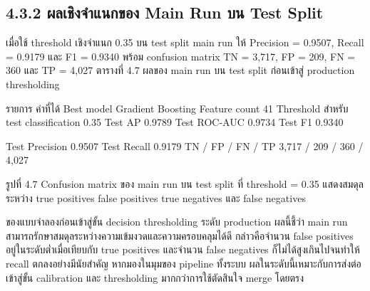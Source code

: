 \documentclass[12pt,a4paper]{report}
\begin{document}
\subsection*{4.3.2 ผลเชิงจำแนกของ Main Run บน Test Split}
เมื่อใช้ threshold เชิงจำแนก 0.35 บน test split main run ให้ Precision = 0.9507, Recall = 0.9179 และ F1 = 0.9340 พร้อม confusion matrix TN = 3,717, FP = 209, FN = 360 และ TP = 4,027 ตารางที่ 4.7 ผลของ main run บน test split ก่อนเข้าสู่ production thresholding\par
รายการ ค่าที่ได้ Best model Gradient Boosting Feature count 41 Threshold สำหรับ test classification 0.35 Test AP 0.9789 Test ROC-AUC 0.9734 Test F1 0.9340\par
\clearpage
Test Precision 0.9507 Test Recall 0.9179 TN / FP / FN / TP 3,717 / 209 / 360 / 4,027\par
\begin{center}\small รูปที่ 4.7 Confusion matrix ของ main run บน test split ที่ threshold = 0.35 แสดงสมดุลระหว่าง true positives false positives true negatives และ false negatives\end{center}
ของแบบจำลองก่อนเข้าสู่ขั้น decision thresholding ระดับ production ผลนี้ชี้ว่า main run สามารถรักษาสมดุลระหว่างความเข้มงวดและความครอบคลุมได้ดี กล่าวคือจำนวน false positives อยู่ในระดับต่ำเมื่อเทียบกับ true positives และจำนวน false negatives ก็ไม่ได้สูงเกินไปจนทำให้ recall ตกลงอย่างมีนัยสำคัญ หากมองในมุมของ pipeline ทั้งระบบ ผลในระดับนี้เหมาะกับการส่งต่อเข้าสู่ขั้น calibration และ thresholding มากกว่าการใช้ตัดสินใจ merge โดยตรง\par
\end{document}
